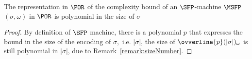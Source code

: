 \begin{lemma}
The representation in $\POR$
of the complexity bound of an $\SFP$-machine
{$\MSFP$}$(\sigma,\omega)$
in $\POR$ is polynomial in the size
of $\sigma$
\end{lemma}
\begin{proof}
By definition of $\SFP$ machine,
there is a polynomial $p$ that expresses the bound
in the size of the encoding of
$\sigma$,~i.e. $|\sigma|$, the size
of {$\ovverline{p}(|\sigma|)_\omega$}
is still polynomial in $|\sigma|$, due to
Remark~\ref{remark:sizeNumber}.
\end{proof}














































































































